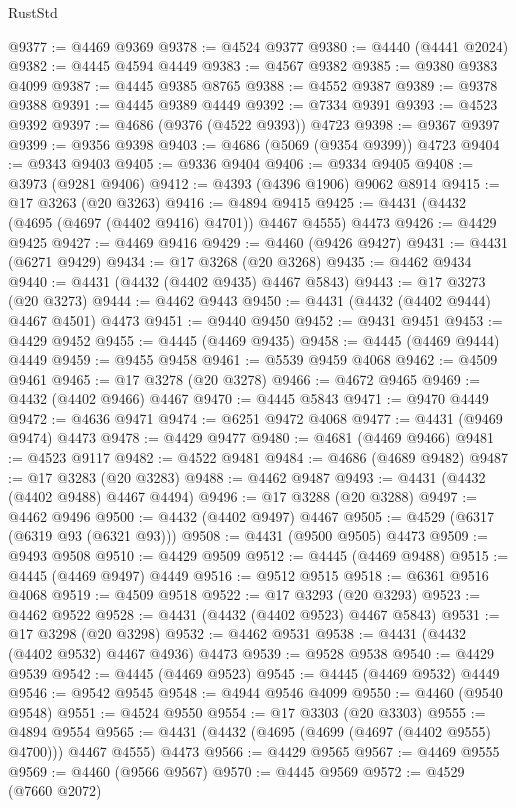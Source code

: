 \begin{lexlean}{RustStd}
\begin{coremodule}
@9377 := @4469 @9369
@9378 := @4524 @9377
@9380 := @4440 (@4441 @2024)
@9382 := @4445 @4594 @4449
@9383 := @4567 @9382
@9385 := @9380 @9383 @4099
@9387 := @4445 @9385 @8765
@9388 := @4552 @9387
@9389 := @9378 @9388
@9391 := @4445 @9389 @4449
@9392 := @7334 @9391
@9393 := @4523 @9392
@9397 := @4686 (@9376 (@4522 @9393)) @4723
@9398 := @9367 @9397
@9399 := @9356 @9398
@9403 := @4686 (@5069 (@9354 @9399)) @4723
@9404 := @9343 @9403
@9405 := @9336 @9404
@9406 := @9334 @9405
@9408 := @3973 (@9281 @9406)
@9412 := @4393 (@4396 @1906) @9062 @8914
@9415 := @17 @3263 (@20 @3263)
@9416 := @4894 @9415
@9425 := @4431 (@4432 (@4695 (@4697 (@4402 @9416) @4701)) @4467 @4555) @4473
@9426 := @4429 @9425
@9427 := @4469 @9416
@9429 := @4460 (@9426 @9427)
@9431 := @4431 (@6271 @9429)
@9434 := @17 @3268 (@20 @3268)
@9435 := @4462 @9434
@9440 := @4431 (@4432 (@4402 @9435) @4467 @5843)
@9443 := @17 @3273 (@20 @3273)
@9444 := @4462 @9443
@9450 := @4431 (@4432 (@4402 @9444) @4467 @4501) @4473
@9451 := @9440 @9450
@9452 := @9431 @9451
@9453 := @4429 @9452
@9455 := @4445 (@4469 @9435)
@9458 := @4445 (@4469 @9444) @4449
@9459 := @9455 @9458
@9461 := @5539 @9459 @4068
@9462 := @4509 @9461
@9465 := @17 @3278 (@20 @3278)
@9466 := @4672 @9465
@9469 := @4432 (@4402 @9466) @4467
@9470 := @4445 @5843
@9471 := @9470 @4449
@9472 := @4636 @9471
@9474 := @6251 @9472 @4068
@9477 := @4431 (@9469 @9474) @4473
@9478 := @4429 @9477
@9480 := @4681 (@4469 @9466)
@9481 := @4523 @9117
@9482 := @4522 @9481
@9484 := @4686 (@4689 @9482)
@9487 := @17 @3283 (@20 @3283)
@9488 := @4462 @9487
@9493 := @4431 (@4432 (@4402 @9488) @4467 @4494)
@9496 := @17 @3288 (@20 @3288)
@9497 := @4462 @9496
@9500 := @4432 (@4402 @9497) @4467
@9505 := @4529 (@6317 (@6319 @93 (@6321 @93)))
@9508 := @4431 (@9500 @9505) @4473
@9509 := @9493 @9508
@9510 := @4429 @9509
@9512 := @4445 (@4469 @9488)
@9515 := @4445 (@4469 @9497) @4449
@9516 := @9512 @9515
@9518 := @6361 @9516 @4068
@9519 := @4509 @9518
@9522 := @17 @3293 (@20 @3293)
@9523 := @4462 @9522
@9528 := @4431 (@4432 (@4402 @9523) @4467 @5843)
@9531 := @17 @3298 (@20 @3298)
@9532 := @4462 @9531
@9538 := @4431 (@4432 (@4402 @9532) @4467 @4936) @4473
@9539 := @9528 @9538
@9540 := @4429 @9539
@9542 := @4445 (@4469 @9523)
@9545 := @4445 (@4469 @9532) @4449
@9546 := @9542 @9545
@9548 := @4944 @9546 @4099
@9550 := @4460 (@9540 @9548)
@9551 := @4524 @9550
@9554 := @17 @3303 (@20 @3303)
@9555 := @4894 @9554
@9565 := @4431 (@4432 (@4695 (@4699 (@4697 (@4402 @9555) @4700))) @4467 @4555) @4473
@9566 := @4429 @9565
@9567 := @4469 @9555
@9569 := @4460 (@9566 @9567)
@9570 := @4445 @9569
@9572 := @4529 (@7660 @2072)

\end{coremodule}
\end{lexlean}
